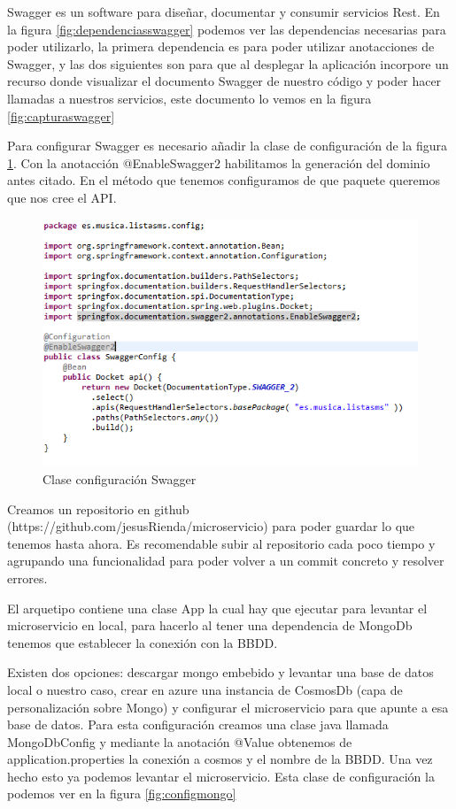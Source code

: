 \documentclass[12pt]{report} %
\begin{document}
Swagger es un software para diseñar, documentar y consumir servicios Rest. En la figura \ref{fig:dependenciasswagger} podemos ver las dependencias necesarias para poder utilizarlo, la primera dependencia es para poder utilizar anotacciones de Swagger, y las dos siguientes son para que al desplegar la aplicación incorpore un recurso donde visualizar el documento Swagger de nuestro código y poder hacer llamadas a nuestros servicios, este documento lo vemos en la figura \ref{fig:capturaswagger}

Para configurar Swagger es necesario añadir la clase de configuración de la figura \ref{fig:cofingswagger}. Con la anotacción @EnableSwagger2 habilitamos la generación del dominio antes citado. En el método que tenemos configuramos de que paquete queremos que nos cree el API.

\begin{figure}
	\centering
	\includegraphics[width=0.7\linewidth]{imagenes/cofingSwagger}
	\caption{Clase configuración Swagger}
	\label{fig:cofingswagger}
\end{figure}


Creamos un repositorio en github (https://github.com/jesusRienda/microservicio) para poder guardar lo que tenemos hasta ahora. Es recomendable subir al repositorio cada poco tiempo y agrupando una funcionalidad para poder volver a un commit concreto y resolver errores.

El arquetipo contiene una clase App la cual hay que ejecutar para levantar el microservicio en local, para hacerlo al tener una dependencia de MongoDb tenemos que establecer la conexión con la BBDD.

 Existen dos opciones: descargar mongo embebido y levantar una base de datos local o nuestro caso, crear en azure una instancia de CosmosDb (capa de personalización sobre Mongo) y configurar el microservicio para que apunte a esa base de datos. Para esta configuración creamos una clase java llamada MongoDbConfig y mediante la anotación @Value obtenemos de application.properties la conexión a cosmos y el nombre de la BBDD. Una vez hecho esto ya podemos levantar el microservicio. Esta clase de configuración la podemos ver en la figura \ref{fig:configmongo}
\end{document}
